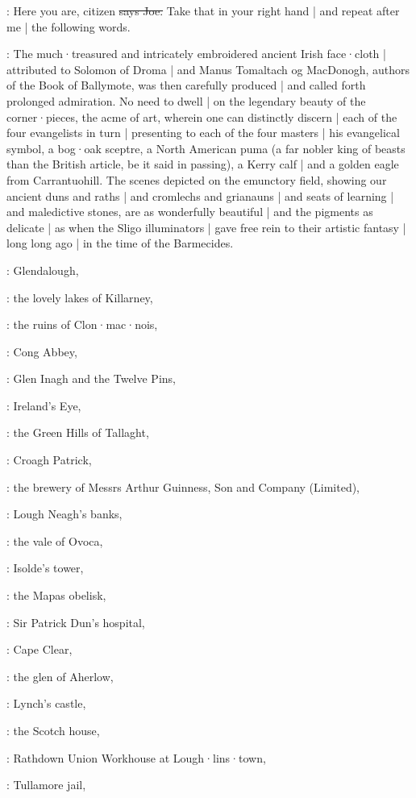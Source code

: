 \joe:
Here you are,
citizen
\sout{says Joe.}
Take that in your right hand |
and repeat after me |
the following words.

:
The much·treasured and intricately embroidered ancient Irish face·cloth |
attributed to Solomon of Droma |
and Manus Tomaltach og MacDonogh,
authors of the Book of Ballymote,
was then carefully produced |
and called forth prolonged admiration.
No need to dwell |
on the legendary beauty of the corner·pieces,
the acme of art,
wherein one can distinctly discern |
each of the four evangelists in turn |
presenting to each of the four masters |
his evangelical symbol,
a bog·oak sceptre,
a North American puma
(a far nobler king of beasts than the British article,
be it said in passing),
a Kerry calf |
and a golden eagle from Carrantuohill.
The scenes depicted on the emunctory field,
showing our ancient duns and raths |
and cromlechs and grianauns |
and seats of learning |
and maledictive stones,
are as wonderfully beautiful |
and the pigments as delicate |
as when the Sligo illuminators |
gave free rein to their artistic fantasy
 |
long long ago |
in the time of the Barmecides.

:
Glendalough,

:
the lovely lakes of Killarney,

:
the ruins of Clon·mac·nois,

:
Cong Abbey,

:
Glen Inagh and the Twelve Pins,

:
Ireland's Eye,

:
the Green Hills of Tallaght,

:
Croagh Patrick,

:
the brewery of Messrs Arthur Guinness,
Son and Company (Limited),

:
Lough Neagh's banks,

:
the vale of Ovoca,

:
Isolde's tower,

:
the Mapas obelisk,

:
Sir Patrick Dun's hospital,

:
Cape Clear,

:
the glen of Aherlow,

:
Lynch's castle,

:
the Scotch house,

:
Rathdown Union Workhouse at Lough·lins·town,

:
Tullamore jail,

